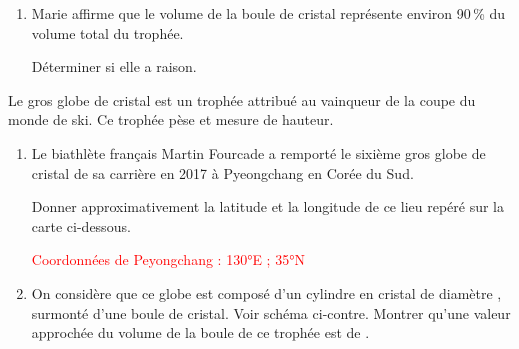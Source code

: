 \begin{exercice*}
\begin{enumerate}
        \item Marie affirme que le volume de la boule de cristal représente environ 90\,\% du volume total du trophée.

        Déterminer si elle a raison.
    \end{enumerate}
\end{exercice*}
\begin{corrige}
        Le gros globe de cristal est un trophée attribué au vainqueur de la coupe du monde de ski.
    Ce trophée pèse  et mesure  de hauteur.

    \begin{enumerate}
        \item Le biathlète français Martin Fourcade a remporté le sixième gros globe de cristal de
        sa carrière en 2017 à Pyeongchang en Corée du Sud.

        Donner approximativement la latitude et la longitude de ce lieu repéré sur la carte ci-dessous.

        \textcolor{red}{Coordonnées de Peyongchang : \ang{130}E ; \ang{35}N}

        \hspace*{-8mm}            
        \Cartographie[Projection,TypeProjection="winkel",VillesI={2,(130,35),"\noexpand\tiny Peyongchang",8},Echelle=1.3,Allegee=10]{}{}

        \item On considère que ce globe est composé d'un cylindre en cristal de diamètre , surmonté d'une boule de cristal.
        Voir schéma ci-contre. Montrer qu'une valeur approchée du volume de la boule de ce trophée est de .


\end{enumerate}
\end{corrige}
